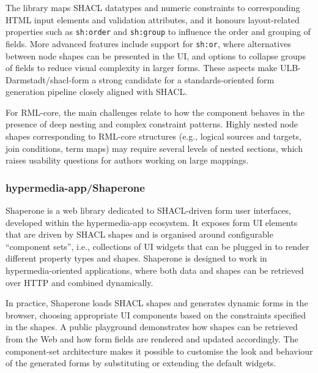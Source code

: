 The library maps SHACL datatypes and numeric constraints to corresponding HTML input elements and validation attributes, and it honours layout-related properties such as \texttt{sh:order} and \texttt{sh:group} to influence the order and grouping of fields. More advanced features include support for \texttt{sh:or}, where alternatives between node shapes can be presented in the UI, and options to collapse groups of fields to reduce visual complexity in larger forms. These aspects make ULB-Darmstadt/shacl-form a strong candidate for a standards-oriented form generation pipeline closely aligned with SHACL.

For RML-core, the main challenges relate to how the component behaves in the presence of deep nesting and complex constraint patterns. Highly nested node shapes corresponding to RML-core structures (e.g., logical sources and targets, join conditions, term maps) may require several levels of nested sections, which raises usability questions for authors working on large mappings.


\subsubsection{hypermedia-app/Shaperone}

Shaperone is a web library dedicated to SHACL-driven form user interfaces, developed within the hypermedia-app ecosystem.\cite{shaperone-github} It exposes form UI elements that are driven by SHACL shapes and is organised around configurable ``component sets'', i.e., collections of UI widgets that can be plugged in to render different property types and shapes.\cite{shaperone-examples} Shaperone is designed to work in hypermedia-oriented applications, where both data and shapes can be retrieved over HTTP and combined dynamically.

In practice, Shaperone loads SHACL shapes and generates dynamic forms in the browser, choosing appropriate UI components based on the constraints specified in the shapes. A public playground demonstrates how shapes can be retrieved from the Web and how form fields are rendered and updated accordingly.\cite{hydra-shacl-shaperone} The component-set architecture makes it possible to customise the look and behaviour of the generated forms by substituting or extending the default widgets.

